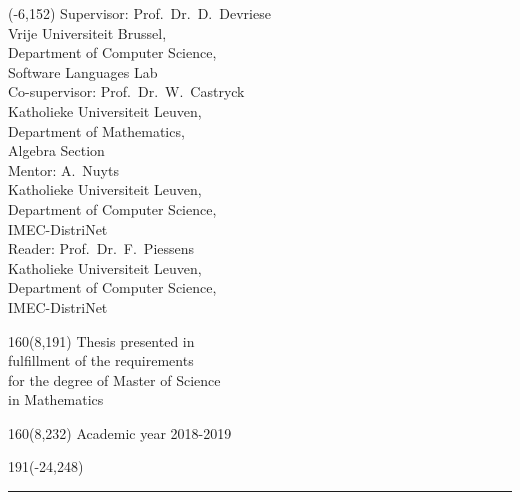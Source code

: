 \documentclass[12pt,a4paper,twoside,xetex]{book} %
\begin{document}
\begin{textblock}{70}(-6,152)
\textblockcolour{}
\vspace{-\parskip}
\flushleft
Supervisor: Prof.~Dr.~D.~Devriese\\[-2pt]
\textcolor{blueaff}{Vrije Universiteit Brussel, \\ 
    Department of Computer Science, \\
    Software Languages Lab}\\[5pt]

Co-supervisor: Prof.~Dr.~W.~Castryck \\[-2pt]
\textcolor{blueaff}{Katholieke Universiteit Leuven, \\
    Department of Mathematics, \\
    Algebra Section}\\[5pt]

Mentor: A.~Nuyts\\[-2pt]
\textcolor{blueaff}{Katholieke Universiteit Leuven, \\
    Department of Computer Science, \\
    IMEC-DistriNet}\\[5pt]

Reader: Prof.~Dr.~F.~Piessens\\[-2pt]
\textcolor{blueaff}{Katholieke Universiteit Leuven, \\
    Department of Computer Science, \\
    IMEC-DistriNet}\\
\end{textblock}
%
\begin{textblock}{160}(8,191)
\textblockcolour{}
\vspace{-\parskip}
\flushright
Thesis presented in\\[4.5pt]
fulfillment of the requirements\\[4.5pt]
for the degree of Master of Science\\[4.5pt]
in Mathematics\\
\end{textblock}
%
\begin{textblock}{160}(8,232)
\textblockcolour{}
\vspace{-\parskip}
\flushright
Academic year 2018-2019
\end{textblock}
%
\begin{textblock}{191}(-24,248)
{\color{blueline}\rule{550pt}{5.5pt}}
\end{textblock}
%
\vfill
\newpage
\end{document}
